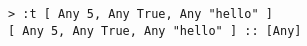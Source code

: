 \begin{repl}\begin{lstlisting}
> :t [ Any 5, Any True, Any "hello" ]
[ Any 5, Any True, Any "hello" ] :: [Any]\end{lstlisting}\end{repl}
